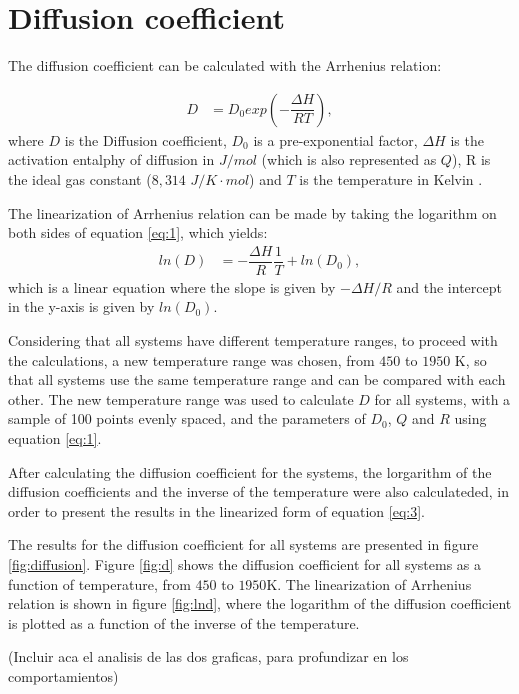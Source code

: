 \clearpage
\section{Diffusion coefficient}

The diffusion coefficient can be calculated with the Arrhenius relation:

\begin{align}
    \label{eq:1}
    D&=D_0 exp\left(-\dfrac{\Delta H}{RT}\right),
\end{align}
where $D$ is the Diffusion coefficient, $D_0$ is a pre-exponential factor, $\Delta H$ is the activation entalphy of diffusion in $J/mol$ (which is also represented as $Q$), R is the ideal gas constant ($8,314$ $J/K\cdot mol$) and $T$ is the temperature in Kelvin \citep{diff}. 

The linearization of Arrhenius relation can be made by taking the logarithm on both sides of equation \eqref{eq:1}, which yields:
\begin{align}
  \label{eq:2}
  ln(D)&=-\dfrac{\Delta H}{R}\dfrac{1}{T} + ln(D_0),
\end{align}
which is a linear equation where the slope is given by $-\Delta H/R$ and the intercept in the y-axis is given by $ln(D_0)$.

Considering that all systems have different temperature ranges, to proceed with the calculations, a new temperature range was chosen, from $450$ to $1950$ K, so that all systems use the same temperature range and can be compared with each other. The new temperature range was used to calculate $D$ for all systems, with a sample of 100 points evenly spaced, and the parameters of $D_0$, $Q$ and $R$ using equation \eqref{eq:1}.

After calculating the diffusion coefficient for the systems, the lorgarithm of the diffusion coefficients and the inverse of the temperature were also calculateded, in order to present the results in the linearized form of equation \eqref{eq:3}.

The results for the diffusion coefficient for all systems are presented in figure \ref{fig:diffusion}. Figure \ref{fig:d} shows the diffusion coefficient for all systems as a function of temperature, from $450$ to $1950$K. The linearization of Arrhenius relation is shown in figure \ref{fig:lnd}, where the logarithm of the diffusion coefficient is plotted as a function of the inverse of the temperature.

(Incluir aca el analisis de las dos graficas, para profundizar en los comportamientos)

